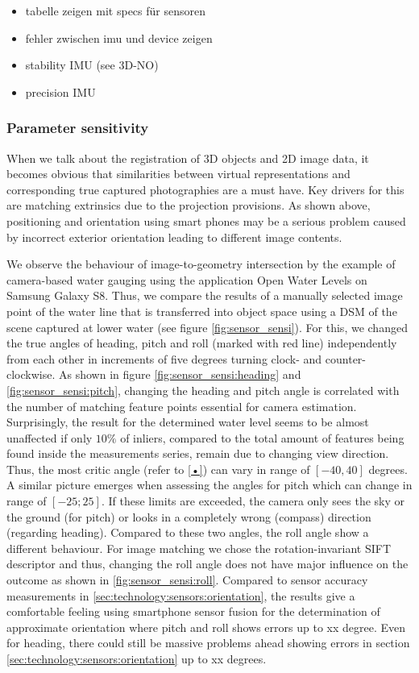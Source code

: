 \documentclass[review]{elsarticle}
\begin{document}
 

\begin{itemize}
\item tabelle zeigen mit specs für sensoren
\item fehler zwischen imu und device zeigen
\item stability IMU (see 3D-NO)
\item precision IMU
\end{itemize}

\subsubsection{Parameter sensitivity}
\label{sec:technology:sensors:sensitivity}
When we talk about the registration of 3D objects and 2D image data, it becomes obvious that similarities between virtual representations and corresponding true captured photographies are a must have. Key drivers for this are matching extrinsics due to the projection provisions. As shown above, positioning and orientation using smart phones may be a serious problem caused by incorrect exterior orientation leading to different image contents. 

We observe the behaviour of image-to-geometry intersection by the example of camera-based water gauging using the application Open Water Levels on Samsung Galaxy S8. Thus, we compare the results of a manually selected image point of the water line that is transferred into object space using a \gls{DSM} of the scene captured at lower water (see figure \ref{fig:sensor_sensi}). For this, we changed the true angles of heading, pitch and roll (marked with red line) independently from each other in increments of five degrees turning clock- and counter-clockwise.
As shown in figure \ref{fig:sensor_sensi:heading} and \ref{fig:sensor_sensi:pitch}, changing the heading and pitch angle is correlated with the number of matching feature points essential for camera estimation. Surprisingly, the result for the determined water level seems to be almost unaffected if only $10\%$ of inliers, compared to the total amount of features being found inside the measurements series, remain due to changing view direction. Thus, the most critic angle (refer to \ref{•}) can vary in range of $[-40,40]$ degrees. A similar picture emerges when assessing the angles for pitch which can change in range of $[-25;25]$. If these limits are exceeded, the camera only sees the sky or the ground (for pitch) or looks in a completely wrong (compass) direction (regarding heading). Compared to these two angles, the roll angle show a different behaviour. For image matching we chose the rotation-invariant \gls{SIFT} descriptor \cite{Lowe2004} and thus, changing the roll angle does not have major influence on the outcome as shown in \ref{fig:sensor_sensi:roll}.
Compared to sensor accuracy measurements in \ref{sec:technology:sensors:orientation}, the results give a comfortable feeling using smartphone sensor fusion for the determination of approximate orientation where pitch and roll shows errors up to xx degree. Even for heading, there could still be massive problems ahead showing errors in section  \ref{sec:technology:sensors:orientation} up to xx degrees.
\end{document}

